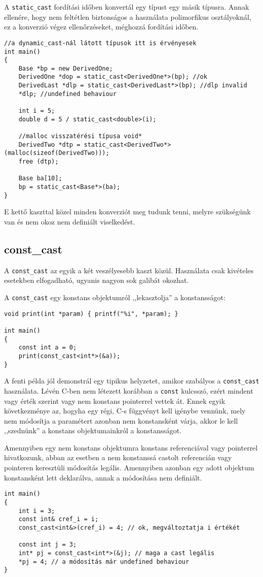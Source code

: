 \documentclass[a4paper,11.5pt,table]{article}
\begin{document}
	\medskip
	A \texttt{static\_cast} fordítási időben konvertál egy típust egy másik típusra. Annak ellenére, hogy nem feltétlen biztonságos a használata polimorfikus osztályoknál, ez a konverzió végez ellenőrzéseket, méghozzá fordítási időben.
	\begin{lstlisting}
//a dynamic_cast-nál látott típusok itt is érvényesek
int main()
{
	Base *bp = new DerivedOne;
	DerivedOne *dop = static_cast<DerivedOne*>(bp); //ok
	DerivedLast *dlp = static_cast<DerivedLast*>(bp); //dlp invalid
	*dlp; //undefined behaviour
	
	int i = 5;
	double d = 5 / static_cast<double>(i);
	
	//malloc visszatérési típusa void*
	DerivedTwo *dtp = static_cast<DerivedTwo*>(malloc(sizeof(DerivedTwo)));
	free (dtp);
	
	Base ba[10];
	bp = static_cast<Base*>(ba);
}
	\end{lstlisting}
	E kettő kaszttal közel minden konverziót meg tudunk tenni, melyre szükségünk van és nem okoz nem definiált viselkedést.
	\subsection{const\_cast}
	A \texttt{const\_cast} az egyik a két veszélyesebb kaszt közül. Használata csak kivételes esetekben elfogadható, ugyanis nagyon sok galibát okozhat. 
	
	A \texttt{const\_cast} egy konstans objektumról ,,lekasztolja'' a konstansságot:
	\begin{lstlisting}
void print(int *param) { printf("%i", *param); }

int main()
{
	const int a = 0;
	print(const_cast<int*>(&a));
}
	\end{lstlisting}
	A fenti példa jól demonstrál egy tipikus helyzetet, amikor szabályos a \texttt{const\_cast} használata. Lévén C-ben nem létezett korábban a \texttt{const} kulcsszó, ezért mindent vagy érték szerint vagy nem konstans pointerrel vettek át. Ennek egyik következménye az, hogyha egy régi, C-s függvényt kell igénybe vennünk, mely nem módosítja a paramétert azonban nem konstansként várja, akkor le kell ,,szednünk'' a konstans objektumainkról a konstansságot.
	
	\smallskip
	Amennyiben egy nem konstans objektumra konstans referenciával vagy pointerrel hivatkozunk, abban az esetben a nem konstanssá castolt referencián vagy pointeren keresztüli módosítás legális. Amennyiben azonban egy adott objektum konstansként lett deklarálva, annak a módosítása nem definiált.
	\begin{lstlisting}
int main()
{
	int i = 3;
	const int& cref_i = i; 
	const_cast<int&>(cref_i) = 4; // ok, megváltoztatja i értékét
	
	const int j = 3;
	int* pj = const_cast<int*>(&j); // maga a cast legális
	*pj = 4; // a módosítás már undefined behaviour
}
	\end{lstlisting}
\end{document}
